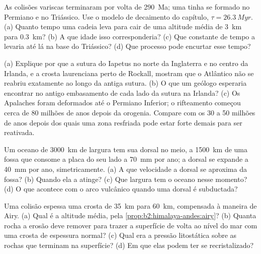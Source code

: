 \begin{exercise}[$\star\star$]\label{exo:b2:wilson-cycle:8}
As colisões variscas terminaram por volta de \qty{290}{Ma}; uma  tinha se formado no Permiano e no
Triássico. Use o modelo de decaimento do capítulo, $\tau = \qty{26.3}{Myr}$. (a) Quanto tempo uma
cadeia leva para cair de uma altitude média de \qty{3}{km} para \qty{0.3}{km}? (b) A que idade isso
corresponderia? (c) Que constante de tempo a levaria até lá na base do Triássico? (d) Que
processo pode encurtar esse tempo?
\end{exercise}

\begin{exercise}[$\star\star$]\label{exo:b2:wilson-cycle:9}
(a) Explique por que a sutura do Iapetus no norte da Inglaterra e no centro da Irlanda, e a crosta
laurenciana perto de Rockall, mostram que o Atlântico não se reabriu exatamente ao longo da antiga sutura.
(b) O que um geólogo esperaria encontrar no antigo embasamento de cada lado da sutura
na Irlanda? (c) Os Apalaches foram deformados até o Permiano Inferior; o rifteamento começou
cerca de 80 milhões de anos depois da orogenia. Compare com os 30 a 50 milhões de anos depois dos quais
uma zona resfriada pode estar forte demais para ser reativada.
\end{exercise}

\begin{exercise}[$\star\star\star$]\label{exo:b2:wilson-cycle:10}
Um oceano de \qty{3000}{km} de largura tem sua dorsal no meio, a \qty{1500}{km} de uma fossa que
consome a placa do seu lado a \qty{70}{mm} por ano; a dorsal se expande a \qty{40}{mm} por
ano, simetricamente. (a) A que velocidade a dorsal se aproxima da fossa? (b) Quando ela a
atinge? (c) Que largura tem o oceano nesse momento? (d) O que acontece com o arco vulcânico quando uma dorsal é
subductada?
\end{exercise}

\begin{exercise}[$\star\star\star$]\label{exo:b2:wilson-cycle:11}
Uma colisão espessa uma crosta de \qty{35}{km} para \qty{60}{km}, compensada à maneira de Airy.
(a) Qual é a altitude média, pela \cref{prop:b2:himalaya-andes:airy}? (b) Quanta rocha a erosão
deve remover para trazer a superfície de volta ao nível do mar com uma crosta de espessura normal?
(c) Qual era a pressão litostática sobre as rochas que terminam na superfície? (d) Em que
 elas podem ter se recristalizado?
\end{exercise}

